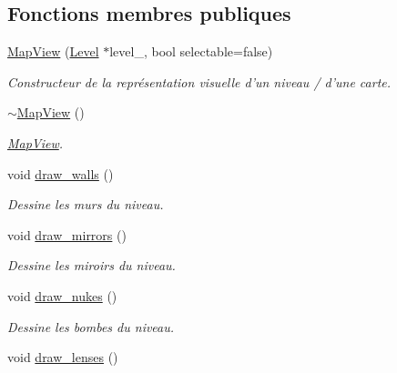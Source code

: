 \subsection*{Fonctions membres publiques}
\begin{DoxyCompactItemize}
\item 
\hyperlink{classMapView_af0587bbc403c323417ea227d247c02c6}{Map\+View} (\hyperlink{classLevel}{Level} $\ast$level\+\_\+, bool selectable=false)
\begin{DoxyCompactList}\small\item\em Constructeur de la représentation visuelle d’un niveau / d’une carte. \end{DoxyCompactList}\item 
\hypertarget{classMapView_a6c3788b3c08e116287872347b3b0e9f6}{\hyperlink{classMapView_a6c3788b3c08e116287872347b3b0e9f6}{$\sim$\+Map\+View} ()}\label{classMapView_a6c3788b3c08e116287872347b3b0e9f6}

\begin{DoxyCompactList}\small\item\em \hyperlink{classMapView}{Map\+View}. \end{DoxyCompactList}\item 
\hypertarget{classMapView_a9243e834166e90fd20bba175fa56a4cc}{void \hyperlink{classMapView_a9243e834166e90fd20bba175fa56a4cc}{draw\+\_\+walls} ()}\label{classMapView_a9243e834166e90fd20bba175fa56a4cc}

\begin{DoxyCompactList}\small\item\em Dessine les murs du niveau. \end{DoxyCompactList}\item 
\hypertarget{classMapView_abb3bba1e54932fc2b64406995881c4ad}{void \hyperlink{classMapView_abb3bba1e54932fc2b64406995881c4ad}{draw\+\_\+mirrors} ()}\label{classMapView_abb3bba1e54932fc2b64406995881c4ad}

\begin{DoxyCompactList}\small\item\em Dessine les miroirs du niveau. \end{DoxyCompactList}\item 
\hypertarget{classMapView_aafe3dc35cb0938ae7e778b3ddbaf0d87}{void \hyperlink{classMapView_aafe3dc35cb0938ae7e778b3ddbaf0d87}{draw\+\_\+nukes} ()}\label{classMapView_aafe3dc35cb0938ae7e778b3ddbaf0d87}

\begin{DoxyCompactList}\small\item\em Dessine les bombes du niveau. \end{DoxyCompactList}\item 
\hypertarget{classMapView_a636b68282c90dab40dba5984acae2605}{void \hyperlink{classMapView_a636b68282c90dab40dba5984acae2605}{draw\+\_\+lenses} ()}\label{classMapView_a636b68282c90dab40dba5984acae2605}


\end{DoxyCompactItemize}
